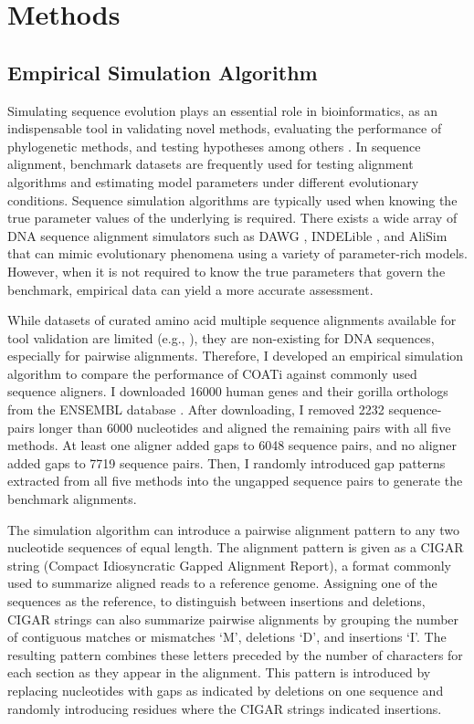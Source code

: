\section{Methods}

\subsection{Empirical Simulation Algorithm}

Simulating sequence evolution plays an essential role in bioinformatics, as an indispensable tool in validating novel methods, evaluating the performance of phylogenetic methods, and testing hypotheses among others \citep{ly2022alisim}. In sequence alignment, benchmark datasets are frequently used for testing alignment algorithms and estimating model parameters under different evolutionary conditions. Sequence simulation algorithms are typically used when knowing the true parameter values of the underlying is required. There exists a wide array of DNA sequence alignment simulators such as DAWG \citep{cartwright2005dawg}, INDELible \citep{fletcher2009indelible}, and AliSim \citep{ly2022alisim} that can mimic evolutionary phenomena using a variety of parameter-rich models. However, when it is not required to know the true parameters that govern the benchmark, empirical data can yield a more accurate assessment.

While datasets of curated amino acid multiple sequence alignments available for tool validation are limited (e.g., \cite{thompson2005balibase,raghava2003oxbench}), they are non-existing for DNA sequences, especially for pairwise alignments. Therefore, I developed an empirical simulation algorithm to compare the performance of COATi against commonly used sequence aligners. I downloaded 16000 human genes and their gorilla orthologs from the ENSEMBL
database \citep{ensembl_hubbard_2002}.
After downloading, I removed 2232 sequence-pairs longer than 6000 nucleotides and aligned the remaining pairs with all five methods.
At least one aligner added gaps to 6048 sequence pairs, and no aligner added gaps to 7719 sequence pairs.
Then, I randomly introduced gap patterns extracted from all five methods into the ungapped sequence pairs to generate the benchmark alignments.

The simulation algorithm can introduce a pairwise alignment pattern to any two nucleotide sequences of equal length. The alignment pattern is given as a CIGAR string (Compact Idiosyncratic Gapped Alignment Report), a format commonly used to summarize aligned reads to a reference genome. Assigning one of the sequences as the reference, to distinguish between insertions and deletions, CIGAR strings can also summarize pairwise alignments by grouping the number of contiguous matches or mismatches `M', deletions `D', and insertions `I'. The resulting pattern combines these letters preceded by the number of characters for each section as they appear in the alignment. This pattern is introduced by replacing nucleotides with gaps as indicated by deletions on one sequence and randomly introducing residues where the CIGAR strings indicated insertions.

